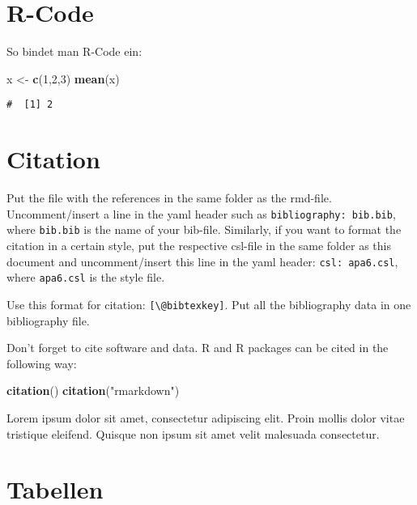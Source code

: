 \documentclass[11pt,ngerman,a4paper,oneside]{article}
\newenvironment{Shaded}{\begin{snugshade}}{\end{snugshade}}
\newcommand{\KeywordTok}[1]{\textcolor[rgb]{0.13,0.29,0.53}{\textbf{#1}}}
\newcommand{\DecValTok}[1]{\textcolor[rgb]{0.00,0.00,0.81}{#1}}
\newcommand{\StringTok}[1]{\textcolor[rgb]{0.31,0.60,0.02}{#1}}
\newcommand{\NormalTok}[1]{#1}
\begin{document}
\section{R-Code}\label{r-code}

So bindet man R-Code ein:

\begin{Shaded}
\begin{Highlighting}[]
\NormalTok{x <-}\StringTok{ }\KeywordTok{c}\NormalTok{(}\DecValTok{1}\NormalTok{,}\DecValTok{2}\NormalTok{,}\DecValTok{3}\NormalTok{)}
\KeywordTok{mean}\NormalTok{(x)}
\end{Highlighting}
\end{Shaded}

\begin{verbatim}
#  [1] 2
\end{verbatim}

\section{Citation}\label{citation}

Put the file with the references in the same folder as the rmd-file.
Uncomment/insert a line in the yaml header such as
\texttt{bibliography:\ bib.bib}, where \texttt{bib.bib} is the name of
your bib-file. Similarly, if you want to format the citation in a
certain style, put the respective csl-file in the same folder as this
document and uncomment/insert this line in the yaml header:
\texttt{csl:\ apa6.csl}, where \texttt{apa6.csl} is the style file.

Use this format for citation: \texttt{{[}\textbackslash{}@bibtexkey{]}}.
Put all the bibliography data in one bibliography file.

Don't forget to cite software and data. R and R packages can be cited in
the following way:

\begin{Shaded}
\begin{Highlighting}[]
\KeywordTok{citation}\NormalTok{()}
\KeywordTok{citation}\NormalTok{(}\StringTok{"rmarkdown"}\NormalTok{)}
\end{Highlighting}
\end{Shaded}

Lorem ipsum dolor sit amet, consectetur adipiscing elit. Proin mollis
dolor vitae tristique eleifend. Quisque non ipsum sit amet velit
malesuada consectetur.

\section{Tabellen}\label{tabellen}
\end{document}
